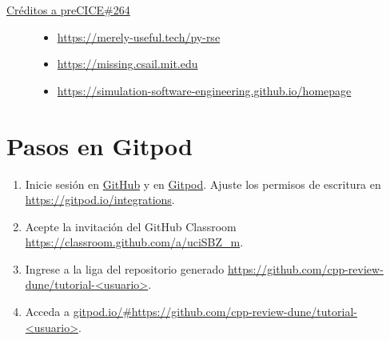 \documentclass[9pt,a3paper]{scrartcl}
\begin{document}
\begin{description}
	\item[\href{https://github.com/precice/tutorials/pull/264/files}{Créditos a preCICE\#264}]
		\leavevmode
		\begin{itemize}
			\item

			      \url{https://merely-useful.tech/py-rse}

			\item

			      \url{https://missing.csail.mit.edu}

			\item

			      \url{https://simulation-software-engineering.github.io/homepage}
		\end{itemize}

\end{description}

\section*{\Huge Pasos en Gitpod}

\begin{enumerate}
	\item

	      Inicie sesión en \href{https://github.com/login}{GitHub} y en
	      \href{https://gitpod.io/login}{Gitpod}.
	      Ajuste los permisos de escritura en \url{https://gitpod.io/integrations}.

	\item

	      Acepte la invitación del GitHub Classroom
	      \url{https://classroom.github.com/a/uciSBZ_m}.

	\item

	      Ingrese a la liga del repositorio generado
	      \url{https://github.com/cpp-review-dune/tutorial-<usuario>}.

	\item

	      Acceda a
	      \url{gitpod.io/#https://github.com/cpp-review-dune/tutorial-<usuario>}.
\end{enumerate}

\vfill

\end{document}
